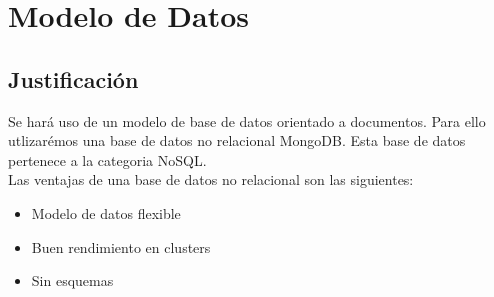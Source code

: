 \clearpage
\chapter{Modelo de Datos}

\section{Justificación}
Se hará uso de un modelo de base de datos orientado a documentos. Para ello utlizarémos una base de datos no relacional MongoDB. Esta base de datos pertenece a la categoria NoSQL. \\
\newline
Las ventajas de una base de datos no relacional son las siguientes:

\begin{itemize}
  \item Modelo de datos flexible
  \item Buen rendimiento en clusters 
  \item Sin esquemas
\end{itemize}

